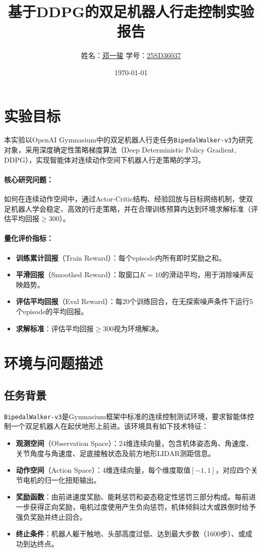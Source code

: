 \documentclass[UTF8,a4paper,12pt]{ctexart}
\title{\textbf{基于DDPG的双足机器人行走控制实验报告}}
\author{姓名：\underline{邓一骏\hspace{3cm}} \quad 学号：\underline{25SD36037\hspace{3cm}}}
\date{\today}
\begin{document}
\maketitle
\tableofcontents
\newpage

\section{实验目标}

本实验以OpenAI Gymnasium中的双足机器人行走任务\texttt{BipedalWalker-v3}为研究对象，采用深度确定性策略梯度算法（Deep Deterministic Policy Gradient, DDPG），实现智能体对连续动作空间下机器人行走策略的学习。

\paragraph{核心研究问题：}
如何在连续动作空间中，通过Actor-Critic结构、经验回放与目标网络机制，使双足机器人学会稳定、高效的行走策略，并在合理训练预算内达到环境求解标准（评估平均回报$\geq 300$）。

\paragraph{量化评价指标：}
\begin{itemize}[leftmargin=2em]
  \item \textbf{训练累计回报}（Train Reward）：每个episode内所有即时奖励之和。
  \item \textbf{平滑回报}（Smoothed Reward）：取窗口$K=10$的滑动平均，用于消除噪声反映趋势。
  \item \textbf{评估平均回报}（Eval Reward）：每20个训练回合，在无探索噪声条件下运行5个episode的平均回报。
  \item \textbf{求解标准}：评估平均回报$\geq 300$视为环境解决。
\end{itemize}

\section{环境与问题描述}

\subsection{任务背景}

\texttt{BipedalWalker-v3}是Gymnasium框架中标准的连续控制测试环境，要求智能体控制一个双足机器人在起伏地形上前进。该环境具有如下技术特征：
\begin{itemize}[leftmargin=2em]
  \item \textbf{观测空间}（Observation Space）：24维连续向量，包含机体姿态角、角速度、关节角度与角速度、足底接触状态及前方地形LIDAR测距信息。
  \item \textbf{动作空间}（Action Space）：4维连续向量，每个维度取值$[-1, 1]$，对应四个关节电机的归一化扭矩输出。
  \item \textbf{奖励函数}：由前进速度奖励、能耗惩罚和姿态稳定性惩罚三部分构成。每前进一步获得正向奖励，电机过度使用产生负向惩罚，机体倾斜过大或跌倒时给予强负奖励并终止回合。
  \item \textbf{终止条件}：机器人躯干触地、头部高度过低、达到最大步数（1600步）、或成功到达终点。
\end{itemize}
\end{document}
